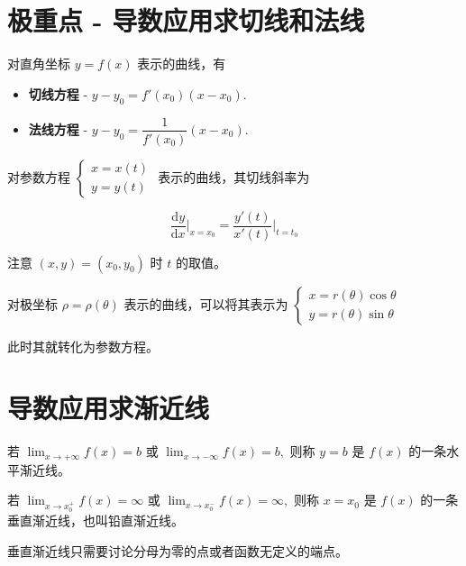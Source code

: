 \section{极重点 - 导数应用求切线和法线}


对直角坐标 $ y = f(x) $ 表示的曲线，有
\begin{itemize}
    \item \textbf{切线方程} - $ y - y_0 = f'(x_0)(x-x_0). $ 
    \item \textbf{法线方程} - $ y - y_0 = \dfrac1{f'(x_0)}(x-x_0). $ 
\end{itemize}


对参数方程
$ \left\{\begin{matrix}
    x = x(t) \\ y = y(t)
\end{matrix}\right. $
表示的曲线，其切线斜率为

$$
    \dfrac{\mathrm{d}y}{\mathrm{d}x}\Big|_{x=x_0} = \dfrac{y'(t)}{x'(t)}\Big|_{t = t_0}
$$ 

注意 $ (x,y) = (x_0,y_0) $ 时 $ t $ 的取值。


对极坐标 
$ \rho = \rho(\theta) $ 
表示的曲线，可以将其表示为
$ \left\{\begin{matrix}
    x = r(\theta)\cos\theta \\ y = r(\theta)\sin\theta
\end{matrix}\right. $

此时其就转化为参数方程。

\section{导数应用求渐近线}


若 $ {\displaystyle\lim_{x\rightarrow +\infty}}f(x)=b $
或 $ {\displaystyle\lim_{x\rightarrow -\infty}}f(x) = b, $ 
则称 $ y=b $ 是 $ f(x) $ 的一条水平渐近线。


若 $ {\displaystyle\lim_{x\rightarrow x_0^+}}f(x)=\infty $ 
或 $ {\displaystyle\lim_{x\rightarrow x_0^-}}f(x)=\infty, $ 则称 $ x=x_0 $ 是 $ f(x) $ 的一条垂直渐近线，也叫铅直渐近线。

垂直渐近线只需要讨论分母为零的点或者函数无定义的端点。


